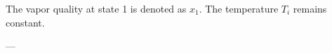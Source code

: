 The vapor quality at state 1 is denoted as \( x_1 \). The temperature \( T_i \) remains constant.

---